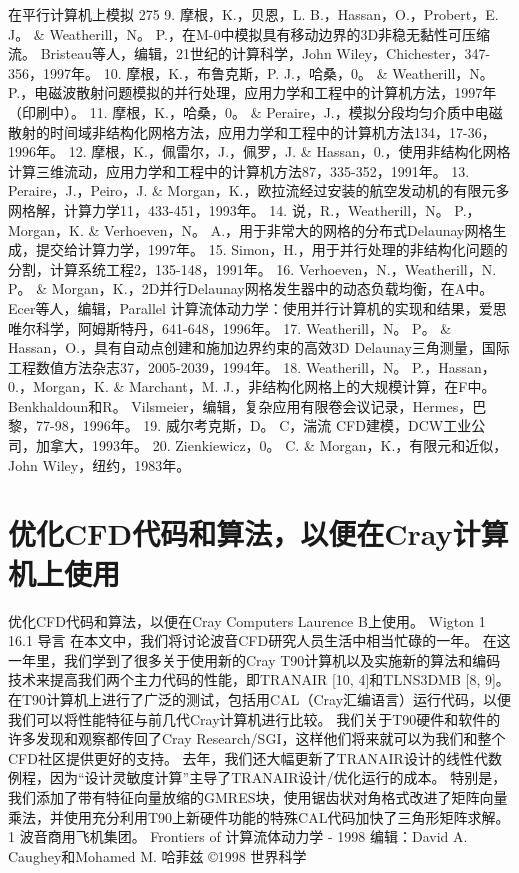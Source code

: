 \documentclass[UTF8,11pt,a4paper,openany,fontset=fandol]{ctexbook}
\begin{document}
在平行计算机上模拟 275 9. 摩根，K.，贝恩，L. B.，Hassan，O.，Probert，E. J。 \& Weatherill，N。 P.，在M-0中模拟具有移动边界的3D非稳无黏性可压缩流。 Bristeau等人，编辑，21世纪的计算科学，John Wiley，Chichester，347-356，1997年。 10. 摩根，K.，布鲁克斯，P. J.，哈桑，0。 \& Weatherill，N。 P.，电磁波散射问题模拟的并行处理，应用力学和工程中的计算机方法，1997年（印刷中）。 11. 摩根，K.，哈桑，0。 \& Peraire，J.，模拟分段均匀介质中电磁散射的时间域非结构化网格方法，应用力学和工程中的计算机方法134，17-36，1996年。 12. 摩根，K.，佩雷尔，J.，佩罗，J. \& Hassan，0.，使用非结构化网格计算三维流动，应用力学和工程中的计算机方法87，335-352，1991年。 13. Peraire，J.，Peiro，J. \& Morgan，K.，欧拉流经过安装的航空发动机的有限元多网格解，计算力学11，433-451，1993年。 14. 说，R.，Weatherill，N。 P.，Morgan，K. \& Verhoeven，N。 A.，用于非常大的网格的分布式Delaunay网格生成，提交给计算力学，1997年。 15. Simon，H.，用于并行处理的非结构化问题的分割，计算系统工程2，135-148，1991年。 16. Verhoeven，N.，Weatherill，N. P。 \& Morgan，K.，2D并行Delaunay网格发生器中的动态负载均衡，在A中。 Ecer等人，编辑，Parallel 计算流体动力学：使用并行计算机的实现和结果，爱思唯尔科学，阿姆斯特丹，641-648，1996年。 17. Weatherill，N。 P。 \& Hassan，O.，具有自动点创建和施加边界约束的高效3D Delaunay三角测量，国际工程数值方法杂志37，2005-2039，1994年。 18. Weatherill，N。 P.，Hassan，0.，Morgan，K. \& Marchant，M. J.，非结构化网格上的大规模计算，在F中。 Benkhaldoun和R。 Vilsmeier，编辑，复杂应用有限卷会议记录，Hermes，巴黎，77-98，1996年。 19. 威尔考克斯，D。 C，湍流 CFD建模，DCW工业公司，加拿大，1993年。 20. Zienkiewicz，0。 C. \& Morgan，K.，有限元和近似，John Wiley，纽约，1983年。

\clearpage
\chapter{优化CFD代码和算法，以便在Cray计算机上使用}
优化CFD代码和算法，以便在Cray Computers Laurence B上使用。 Wigton 1 16.1 导言 在本文中，我们将讨论波音CFD研究人员生活中相当忙碌的一年。 在这一年里，我们学到了很多关于使用新的Cray T90计算机以及实施新的算法和编码技术来提高我们两个主力代码的性能，即TRANAIR [10, 4]和TLNS3DMB [8, 9]。 在T90计算机上进行了广泛的测试，包括用CAL（Cray汇编语言）运行代码，以便我们可以将性能特征与前几代Cray计算机进行比较。 我们关于T90硬件和软件的许多发现和观察都传回了Cray Research/SGI，这样他们将来就可以为我们和整个CFD社区提供更好的支持。 去年，我们还大幅更新了TRANAIR设计的线性代数例程，因为“设计灵敏度计算”主导了TRANAIR设计/优化运行的成本。 特别是，我们添加了带有特征向量放缩的GMRES块，使用锯齿状对角格式改进了矩阵向量乘法，并使用充分利用T90上新硬件功能的特殊CAL代码加快了三角形矩阵求解。 1 波音商用飞机集团。 Frontiers of 计算流体动力学 - 1998 编辑：David A. Caughey和Mohamed M. 哈菲兹 ©1998 世界科学
\end{document}
